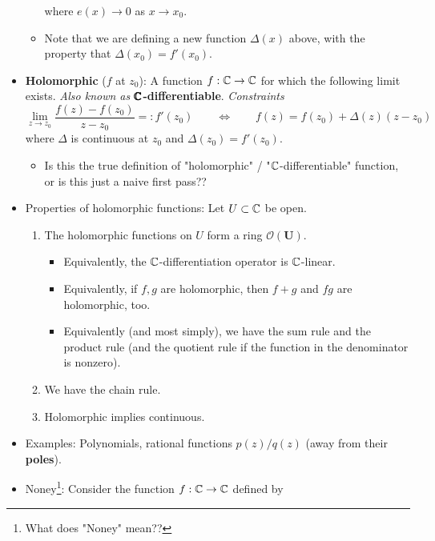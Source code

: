 \documentclass[../notes.tex]{subfiles}
\begin{document}
\begin{itemize}
\begin{itemize}
\begin{equation*}
        \end{equation*}
        where $e(x)\to 0$ as $x\to x_0$.
        \item Note that we are defining a new function $\Delta(x)$ above, with the property that $\Delta(x_0)=f'(x_0)$.
    \end{itemize}
    \pagebreak
    \item \textbf{Holomorphic} ($f$ at $z_0$): A function $f:\mathbb{C}\to\mathbb{C}$ for which the following limit exists. \emph{Also known as} \textbf{$\pmb{\mathbb{C}}$-differentiable}. \emph{Constraints}
    \begin{equation*}
        \lim_{z\to z_0}\frac{f(z)-f(z_0)}{z-z_0} =: f'(z_0)
        \qquad\Longleftrightarrow\qquad
        f(z) = f(z_0)+\Delta(z)(z-z_0)
    \end{equation*}
    where $\Delta$ is continuous at $z_0$ and $\Delta(z_0)=f'(z_0)$.
    \begin{itemize}
        \item Is this the true definition of "holomorphic" / "$\mathbb{C}$-differentiable" function, or is this just a naive first pass??
    \end{itemize}
    \item Properties of holomorphic functions: Let $U\subset\mathbb{C}$ be open.
    \begin{enumerate}
        \item The holomorphic functions on $U$ form a ring $\bm{\mathcal{O}(U)}$.
        \begin{itemize}
            \item Equivalently, the $\mathbb{C}$-differentiation operator is $\mathbb{C}$-linear.
            \item Equivalently, if $f,g$ are holomorphic, then $f+g$ and $fg$ are holomorphic, too.
            \item Equivalently (and most simply), we have the sum rule and the product rule (and the quotient rule if the function in the denominator is nonzero).
        \end{itemize}
        \item We have the chain rule.
        \item Holomorphic implies continuous.
    \end{enumerate}
    \item Examples: Polynomials, rational functions $p(z)/q(z)$ (away from their \textbf{poles}).
    \item Noney\footnote{What does "Noney" mean??}: Consider the function $f:\mathbb{C}\to\mathbb{C}$ defined by
    \begin{equation*}

\end{equation*}
\end{itemize}
\end{document}
